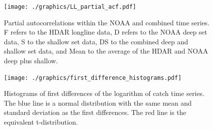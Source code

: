 \documentclass[12pt,letterpaper]{article}
\begin{document}
\begin{figure}
\begin{center}
\texttt{[image: ./graphics/LL\_partial\_acf.pdf]}
\caption{\label{fig:LLpartialacf}
Partial autocorrelations within the NOAA and combined time
series. F refers to the HDAR longline data, D refers to the NOAA deep
set data, S to the shallow set data,
DS to the combined deep and shallow set data, and Mean to the average
of the HDAR and NOAA deep plus shallow.
}
\end{center}
\end{figure}

\begin{figure}
\begin{center}
\texttt{[image: ./graphics/first\_difference\_histograms.pdf]}
\caption{\label{fig:diff1histo}
Histograms of first differences of the logarithm of catch time series. 
The blue line is
a normal distribution with the same mean and standard deviation as the
first differences. The red line is the equivalent t-distribution.}
\end{center}
\end{figure}
\end{document}
